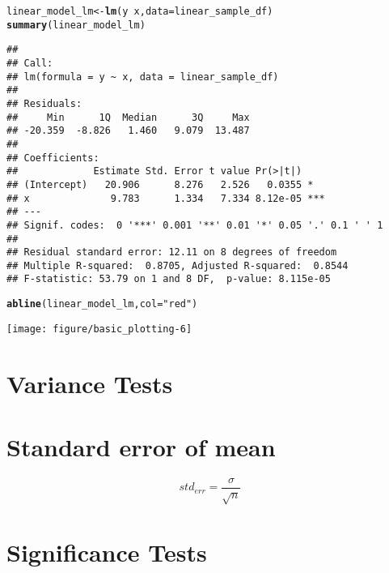 \documentclass[a4paper,10pt]{book}\usepackage[]{graphicx}\usepackage[]{color}
\makeatletter
\def\maxwidth{ %
  \ifdim\Gin@nat@width>\linewidth
    \linewidth
  \else
    \Gin@nat@width
  \fi
}
\newcommand{\hlstr}[1]{\textcolor[rgb]{0.192,0.494,0.8}{#1}}%
\newcommand{\hlopt}[1]{\textcolor[rgb]{0,0,0}{#1}}%
\newcommand{\hlstd}[1]{\textcolor[rgb]{0.345,0.345,0.345}{#1}}%
\newcommand{\hlkwb}[1]{\textcolor[rgb]{0.69,0.353,0.396}{#1}}%
\newcommand{\hlkwc}[1]{\textcolor[rgb]{0.333,0.667,0.333}{#1}}%
\newcommand{\hlkwd}[1]{\textcolor[rgb]{0.737,0.353,0.396}{\textbf{#1}}}%
\newenvironment{kframe}{%
 \def\at@end@of@kframe{}%
 \ifinner\ifhmode%
  \def\at@end@of@kframe{\end{minipage}}%
  \begin{minipage}{\columnwidth}%
 \fi\fi%
 \def\FrameCommand##1{\hskip\@totalleftmargin \hskip-\fboxsep
 \colorbox{shadecolor}{##1}\hskip-\fboxsep
     \hskip-\linewidth \hskip-\@totalleftmargin \hskip\columnwidth}%
 \MakeFramed {\advance\hsize-\width
   \@totalleftmargin\z@ \linewidth\hsize
   \@setminipage}}%
 {\par\unskip\endMakeFramed%
 \at@end@of@kframe}
\newenvironment{knitrout}{}{} %
\makeatother
\begin{document}
\begin{knitrout}
\begin{kframe}
\begin{alltt}
\hlstd{linear_model_lm} \hlkwb{<-} \hlkwd{lm}\hlstd{(y} \hlopt{~} \hlstd{x,} \hlkwc{data}\hlstd{=linear_sample_df)}
\hlkwd{summary}\hlstd{(linear_model_lm)}
\end{alltt}
\begin{verbatim}
## 
## Call:
## lm(formula = y ~ x, data = linear_sample_df)
## 
## Residuals:
##     Min      1Q  Median      3Q     Max 
## -20.359  -8.826   1.460   9.079  13.487 
## 
## Coefficients:
##             Estimate Std. Error t value Pr(>|t|)    
## (Intercept)   20.906      8.276   2.526   0.0355 *  
## x              9.783      1.334   7.334 8.12e-05 ***
## ---
## Signif. codes:  0 '***' 0.001 '**' 0.01 '*' 0.05 '.' 0.1 ' ' 1
## 
## Residual standard error: 12.11 on 8 degrees of freedom
## Multiple R-squared:  0.8705,	Adjusted R-squared:  0.8544 
## F-statistic: 53.79 on 1 and 8 DF,  p-value: 8.115e-05
\end{verbatim}
\begin{alltt}
\hlkwd{abline}\hlstd{(linear_model_lm,} \hlkwc{col}\hlstd{=}\hlstr{"red"}\hlstd{)}
\end{alltt}
\end{kframe}
\texttt{[image: figure/basic\_plotting-6]} 

\end{knitrout}


\section*{Variance Tests}



\section{Standard error of mean}

$$ std_{err} = \frac{\sigma}{\sqrt{n}} $$



\section*{Significance Tests}
\end{document}
